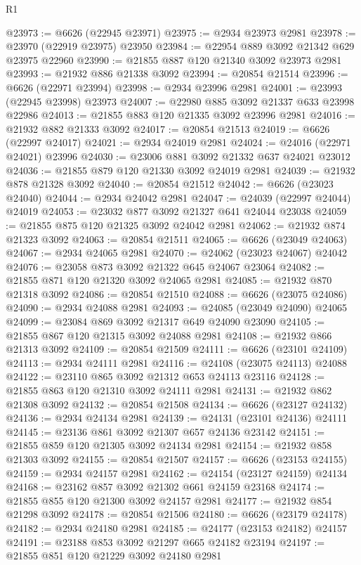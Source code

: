 \begin{lexlean}{R1}
\begin{coremodule}
@23973 := @6626 (@22945 @23971)
@23975 := @2934 @23973 @2981
@23978 := @23970 (@22919 @23975) @23950
@23984 := @22954 @889 @3092 @21342 @629 @23975 @22960
@23990 := @21855 @887 @120 @21340 @3092 @23973 @2981
@23993 := @21932 @886 @21338 @3092
@23994 := @20854 @21514
@23996 := @6626 (@22971 @23994)
@23998 := @2934 @23996 @2981
@24001 := @23993 (@22945 @23998) @23973
@24007 := @22980 @885 @3092 @21337 @633 @23998 @22986
@24013 := @21855 @883 @120 @21335 @3092 @23996 @2981
@24016 := @21932 @882 @21333 @3092
@24017 := @20854 @21513
@24019 := @6626 (@22997 @24017)
@24021 := @2934 @24019 @2981
@24024 := @24016 (@22971 @24021) @23996
@24030 := @23006 @881 @3092 @21332 @637 @24021 @23012
@24036 := @21855 @879 @120 @21330 @3092 @24019 @2981
@24039 := @21932 @878 @21328 @3092
@24040 := @20854 @21512
@24042 := @6626 (@23023 @24040)
@24044 := @2934 @24042 @2981
@24047 := @24039 (@22997 @24044) @24019
@24053 := @23032 @877 @3092 @21327 @641 @24044 @23038
@24059 := @21855 @875 @120 @21325 @3092 @24042 @2981
@24062 := @21932 @874 @21323 @3092
@24063 := @20854 @21511
@24065 := @6626 (@23049 @24063)
@24067 := @2934 @24065 @2981
@24070 := @24062 (@23023 @24067) @24042
@24076 := @23058 @873 @3092 @21322 @645 @24067 @23064
@24082 := @21855 @871 @120 @21320 @3092 @24065 @2981
@24085 := @21932 @870 @21318 @3092
@24086 := @20854 @21510
@24088 := @6626 (@23075 @24086)
@24090 := @2934 @24088 @2981
@24093 := @24085 (@23049 @24090) @24065
@24099 := @23084 @869 @3092 @21317 @649 @24090 @23090
@24105 := @21855 @867 @120 @21315 @3092 @24088 @2981
@24108 := @21932 @866 @21313 @3092
@24109 := @20854 @21509
@24111 := @6626 (@23101 @24109)
@24113 := @2934 @24111 @2981
@24116 := @24108 (@23075 @24113) @24088
@24122 := @23110 @865 @3092 @21312 @653 @24113 @23116
@24128 := @21855 @863 @120 @21310 @3092 @24111 @2981
@24131 := @21932 @862 @21308 @3092
@24132 := @20854 @21508
@24134 := @6626 (@23127 @24132)
@24136 := @2934 @24134 @2981
@24139 := @24131 (@23101 @24136) @24111
@24145 := @23136 @861 @3092 @21307 @657 @24136 @23142
@24151 := @21855 @859 @120 @21305 @3092 @24134 @2981
@24154 := @21932 @858 @21303 @3092
@24155 := @20854 @21507
@24157 := @6626 (@23153 @24155)
@24159 := @2934 @24157 @2981
@24162 := @24154 (@23127 @24159) @24134
@24168 := @23162 @857 @3092 @21302 @661 @24159 @23168
@24174 := @21855 @855 @120 @21300 @3092 @24157 @2981
@24177 := @21932 @854 @21298 @3092
@24178 := @20854 @21506
@24180 := @6626 (@23179 @24178)
@24182 := @2934 @24180 @2981
@24185 := @24177 (@23153 @24182) @24157
@24191 := @23188 @853 @3092 @21297 @665 @24182 @23194
@24197 := @21855 @851 @120 @21229 @3092 @24180 @2981

\end{coremodule}
\end{lexlean}
